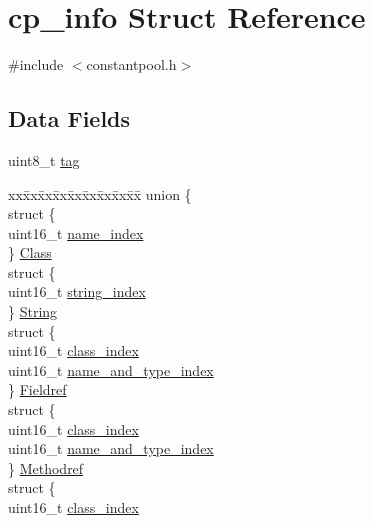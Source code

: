 \hypertarget{structcp__info}{}\section{cp\+\_\+info Struct Reference}
\label{structcp__info}


{\ttfamily \#include $<$constantpool.\+h$>$}

\subsection*{Data Fields}
\begin{DoxyCompactItemize}
\item 
uint8\+\_\+t \hyperlink{structcp__info_a29d87595bc993eb6cd53f30e8305ec74}{tag}
\item 
\begin{tabbing}
xx\=xx\=xx\=xx\=xx\=xx\=xx\=xx\=xx\=\kill
union \{\\
\>struct \{\\
\>\>uint16\_t \hyperlink{structcp__info_a3c8912fe67e7d3f9ce150aa6f5bec22d}{name\_index}\\
\>\} \hyperlink{structcp__info_aeb14fdcb3ba2363a18f2ecbeac15ac41}{Class}\\
\>struct \{\\
\>\>uint16\_t \hyperlink{structcp__info_aa63dfc7668d7eff682f88b09c48eddc8}{string\_index}\\
\>\} \hyperlink{structcp__info_a0e7c2a98e0cf4ffeb32047c7d78d835c}{String}\\
\>struct \{\\
\>\>uint16\_t \hyperlink{structcp__info_ab2b48e96f2178c47f9f6b683c9b2fc59}{class\_index}\\
\>\>uint16\_t \hyperlink{structcp__info_ad7a8733b3b078818a59cc33eb1fa7dc3}{name\_and\_type\_index}\\
\>\} \hyperlink{structcp__info_ac2cdad99f486a8e1bd1a66a06556a945}{Fieldref}\\
\>struct \{\\
\>\>uint16\_t \hyperlink{structcp__info_ab2b48e96f2178c47f9f6b683c9b2fc59}{class\_index}\\
\>\>uint16\_t \hyperlink{structcp__info_ad7a8733b3b078818a59cc33eb1fa7dc3}{name\_and\_type\_index}\\
\>\} \hyperlink{structcp__info_a3a2f2fccc08f122c44a2cd3405ee6264}{Methodref}\\
\>struct \{\\
\>\>uint16\_t \hyperlink{structcp__info_ab2b48e96f2178c47f9f6b683c9b2fc59}{class\_index}\\

\end{tabbing}
\end{DoxyCompactItemize}
